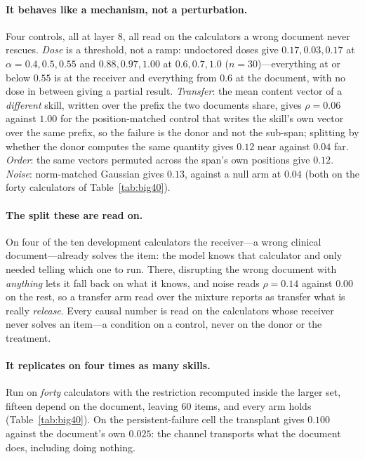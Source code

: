 \documentclass{article}
\begin{document}
\paragraph{It behaves like a mechanism, not a perturbation.} Four controls, all
at layer 8, all read on the calculators a wrong document never rescues.
\emph{Dose} is a threshold, not a ramp: undoctored doses give $0.17, 0.03, 0.17$
at $\alpha = 0.4, 0.5, 0.55$ and $0.88, 0.97, 1.00$ at $0.6, 0.7, 1.0$
($n=30$)---everything at or below $0.55$ is at the receiver and everything from
$0.6$ at the document, with no dose in between giving a partial result.
\emph{Transfer}: the mean content vector of a \emph{different} skill, written
over the prefix the two documents share, gives $\rho = 0.06$ against $1.00$ for
the position-matched control that writes the skill's own vector over the same
prefix, so the failure is the donor and not the sub-span; splitting by whether
the donor computes the same quantity gives $0.12$ near against $0.04$ far.
\emph{Order}: the same vectors permuted across the span's own positions give
$0.12$. \emph{Noise}: norm-matched Gaussian gives $0.13$, against a null arm at
$0.04$ (both on the forty calculators of Table~\ref{tab:big40}).

\paragraph{The split these are read on.} On four of the ten development
calculators the receiver---a wrong clinical document---already solves the item:
the model knows that calculator and only needed telling which one to run. There,
disrupting the wrong document with \emph{anything} lets it fall back on what it
knows, and noise reads $\rho = 0.14$ against $0.00$ on the rest, so a transfer
arm read over the mixture reports as transfer what is really \emph{release}.
Every causal number is read on the calculators whose receiver never solves an
item---a condition on a control, never on the donor or the treatment.

\paragraph{It replicates on four times as many skills.} Run on \emph{forty}
calculators with the restriction recomputed inside the larger set, fifteen
depend on the document, leaving $60$ items, and every arm holds
(Table~\ref{tab:big40}). On the persistent-failure cell the transplant gives
$0.100$ against the document's own $0.025$: the channel transports what the
document does, including doing nothing.
\end{document}
